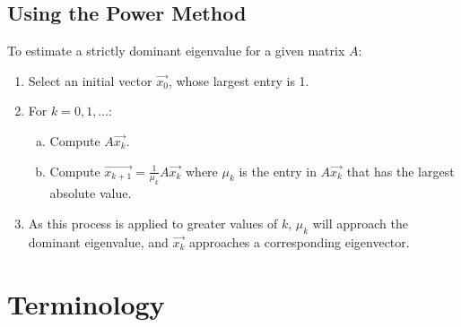\documentclass[a4paper,12pt]{article}
\theoremstyle{definition}
\theoremstyle{definition}
\begin{document}
	\subsection{Using the Power Method}
	\label{sec:power-method}
	
	To estimate a strictly dominant eigenvalue for a given matrix $A$:
	\begin{enumerate}
		\item Select an initial vector $\vec{x_0}$, whose largest entry is 1.
		
		\item For $k = 0, 1, \ldots$: 
		\begin{enumerate}[a.]
			\item Compute $A\vec{x_k}$.
			
			\item Compute $\vec{x_{k + 1}} = \frac{1}{\mu_k}A\vec{x_k}$ where $\mu_k$ is the entry in $A\vec{x_k}$ that has the largest absolute value.
		\end{enumerate}
		
		\item As this process is applied to greater values of $k$, $\mu_k$ will approach the dominant eigenvalue, and $\vec{x_k}$ approaches a corresponding eigenvector.
	\end{enumerate}
	\newpage
	
	\section{Terminology}
\end{document}
